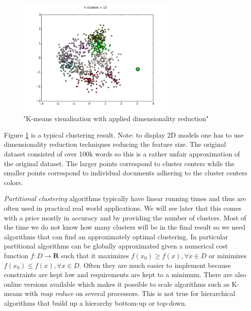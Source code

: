     \begin{figure}[h!]
      \centering
        \includegraphics[width=0.7\textwidth]{kmeans_clustering.png}
        \caption{"K-means visualisation with applied dimensionality reduction"}
        \label{kmeans_clustering}
    \end{figure}

    Figure \ref{kmeans_clustering} is a typical clustering result. Note: to display 2D models one has to use dimensionality reduction techniques reducing the feature size. The original dataset consisted of over 100k words so this is a rather unfair approximation of the original dataset. The larger points correspond to cluster centers while the smaller points correspond to individual documents adhering to the cluster centers colors. 

    \emph{Partitional clustering} algorithms typically have linear running times and thus are often used in practical real world applications. We will see later that this comes with a price mostly in accuracy and by providing the number of clusters. Most of the time we do not know how many clusters will be in the final result so we need algorithms that can find an approximately optimal clustering. In particular partitional algorithms can be globally approximated given a numerical cost function $f:D \to \mathbf{R}$ such that it maximizes $f(x_0) \geq f(x), \forall x \in D$  or minimizes $f(x_0) \leq f(x), \forall x \in D$. Often they are much easier to implement because constraints are kept low and requirements are kept to a minimum. There are also online versions available which makes it possible to scale algorithms such as K-means with \emph{map reduce} on several processors. This is not true for hierarchical algorithms that build up a hierarchy bottom-up or top-down.

